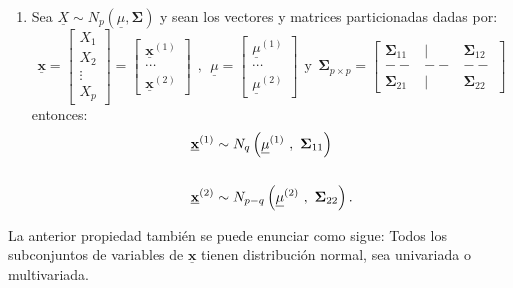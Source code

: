 \documentclass[
]{book}
\providecommand{\tightlist}{%
  \setlength{\itemsep}{0pt}\setlength{\parskip}{0pt}}
\theoremstyle{definition}
\theoremstyle{definition}
\theoremstyle{definition}
\theoremstyle{definition}
\theoremstyle{remark}
\begin{document}
\begin{enumerate}
\def\labelenumi{\arabic{enumi}.}
\setcounter{enumi}{3}
\tightlist
\item
  Sea \(\underline{X}\sim N_p(\underline{\mu},\mathbf{\Sigma})\) y sean los vectores y matrices particionadas dadas por:
  \[
  \underline{\mathbf{x}}=\begin{bmatrix}
  X_1 \\ X_2 \\  \vdots  \\ X_p
  \end{bmatrix}=\begin{bmatrix}
  \underline{\mathbf{x}}^{(1)} \\ \cdots \\ \underline{\mathbf{x}}^{(2)}
  \end{bmatrix} \ \ , \ \ 
  \underline{\mu}=\begin{bmatrix}
  \underline{\mu}^{(1)} \\ \cdots \\ \underline{\mu}^{(2)}
  \end{bmatrix}\ \ \text{y} \ \ 
  \mathbf{\Sigma}_{p\times p}= 
   \begin{bmatrix}
  \mathbf{\Sigma}_{11} & | & \mathbf{\Sigma}_{12} \\
  -- & -- & -- \\
  \mathbf{\Sigma}_{21} & | & \mathbf{\Sigma}_{22}
  \end{bmatrix}
  \]
  entonces:
  \begin{align}
  \underline{\mathbf{x}}^{(1)} & \sim N_q\left(\underline{\mu}^{(1)} \ , \ \mathbf{\Sigma}_{11}\right) \notag  \\ \\
  \underline{\mathbf{x}}^{(2)} & \sim N_{p-q}\left(\underline{\mu}^{(2)} \ , \ \mathbf{\Sigma}_{22}\right).
  \label{eq:prop-4}
  \end{align}
\end{enumerate}

La anterior propiedad también se puede enunciar como sigue: Todos los subconjuntos de variables de \(\underline{\mathbf{x}}\) tienen distribución normal, sea univariada o multivariada.
\end{document}
